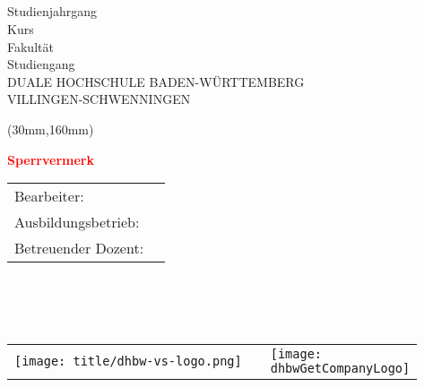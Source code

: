 \thispagestyle{empty}


\begin{center}
\vspace*{1cm} \ \\
{\fontsize{40}{48}\selectfont \bfseries \dhbwGetTitle \\}
\vspace{0.75cm}
{\Large\bfseries \dhbwGetSubtitle \\}
\vspace{1.5cm}
\dhbwGetTextType \\
Studienjahrgang \dhbwGetAcademicYear \\
Kurs \dhbwGetCourse \\
\vspace{1.5cm}
Fakultät \dhbwGetFaculty \\
Studiengang \dhbwGetFieldOfStudy \\
DUALE HOCHSCHULE BADEN-WÜRTTEMBERG\\
VILLINGEN-SCHWENNINGEN\\
\end{center}
\begin{textblock*}{50mm}(30mm,160mm)
    \begin{rotate}{50}
        \fontsize{34}{40}\bfseries\textcolor{red}{Sperrvermerk}
    \end{rotate}
\end{textblock*}
\begin{table}[b]
\begin{tabular}{ll}
Bearbeiter: 		&	\dhbwGetAuthor \\
Ausbildungsbetrieb:	&	\dhbwGetCompanyName \\
Betreuender Dozent:	&	\dhbwGetLecturer \\
\end{tabular}\\
\\
\\
\begin{tabularx}{\textwidth}{lXl}
\texttt{[image: title/dhbw-vs-logo.png]} &
&
\raisebox{\height}{\texttt{[image: \\dhbwGetCompanyLogo]} }
\end{tabularx}
\end{table}

\restoregeometry
